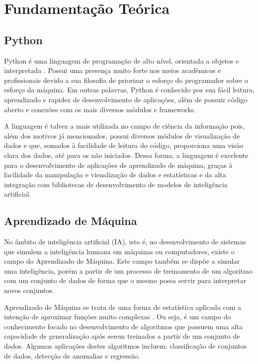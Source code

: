 \chapter{Fundamentação Teórica}
\label{fund_teo}

\section{Python}

Python é uma linguagem de programação de alto nível, orientada a objetos e interpretada \cite{van1995python}. Possui uma presença muito forte nos meios acadêmicos e profissionais devido a sua filosofia de priorizar o esforço do programador sobre o esforço da máquina. Em outras palavras, Python é conhecido por sua fácil leitura, aprendizado e rapidez de desenvolvimento de aplicações, além de possuir código aberto e conexões com os mais diversos módulos e frameworks.

A linguagem é talvez a mais utilizada no campo de ciência da informação pois, além dos motivos já mencionados, possui diversos módulos de visualização de dados e que, somados à facilidade de leitura do código, proporciona uma visão clara dos dados, até para os não iniciados. Dessa forma, a linguagem é excelente para o desenvolvimento de aplicações de aprendizado de máquina, graças à facilidade da manipulação e visualização de dados e estatísticas e da alta integração com bibliotecas de desenvolvimento de modelos de inteligência artificial.

\section{Aprendizado de Máquina}

No âmbito de inteligência artificial (IA), isto é, no desenvolvimento de sistemas que simulem a inteligência humana em máquinas ou computadores, existe o campo do Aprendizado de Máquina. Este campo também se dispõe a simular uma inteligência, porém a partir de um processo de treinamento de um algoritmo com um conjunto de dados de forma que o mesmo possa servir para interpretar novos conjuntos.

Aprendizado de Máquina se trata de uma forma de estatística aplicada com a intenção de aproximar funções muito complexas \cite{GoodBengCour16}. Ou seja, é um campo do conhecimento focado no desenvolvimento de algoritmos que possuem uma alta capacidade de generalização após serem treinados a partir de um conjunto de dados. Algumas aplicações destes algoritmos incluem: classificação de conjuntos de dados, detecção de anomalias e regressão.

